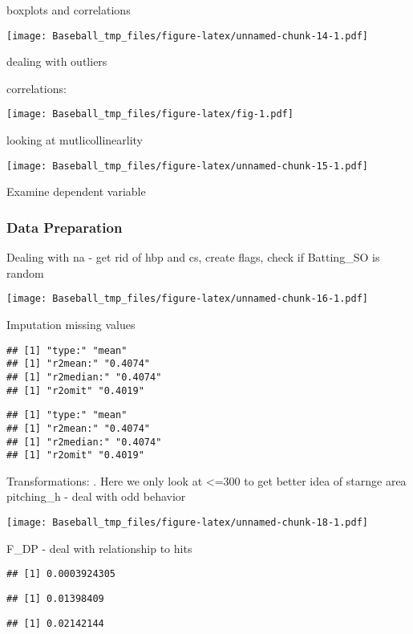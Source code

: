 \documentclass[
]{article}
\begin{document}
boxplots and correlations

\texttt{[image: Baseball\_tmp\_files/figure-latex/unnamed-chunk-14-1.pdf]}

dealing with outliers

correlations:

\texttt{[image: Baseball\_tmp\_files/figure-latex/fig-1.pdf]}

looking at mutlicollinearlity

\texttt{[image: Baseball\_tmp\_files/figure-latex/unnamed-chunk-15-1.pdf]}

Examine dependent variable

\hypertarget{data-preparation}{%
\subsubsection{Data Preparation}\label{data-preparation}}

Dealing with na - get rid of hbp and cs, create flags, check if
Batting\_SO is random

\texttt{[image: Baseball\_tmp\_files/figure-latex/unnamed-chunk-16-1.pdf]}

Imputation missing values

\begin{verbatim}
## [1] "type:" "mean" 
## [1] "r2mean:" "0.4074" 
## [1] "r2median:" "0.4074"   
## [1] "r2omit" "0.4019"
\end{verbatim}

\begin{verbatim}
## [1] "type:" "mean" 
## [1] "r2mean:" "0.4074" 
## [1] "r2median:" "0.4074"   
## [1] "r2omit" "0.4019"
\end{verbatim}

Transformations: . Here we only look at \textless=300 to get better idea
of starnge area pitching\_h - deal with odd behavior

\texttt{[image: Baseball\_tmp\_files/figure-latex/unnamed-chunk-18-1.pdf]}

F\_DP - deal with relationship to hits

\begin{verbatim}
## [1] 0.0003924305
\end{verbatim}

\begin{verbatim}
## [1] 0.01398409
\end{verbatim}

\begin{verbatim}
## [1] 0.02142144
\end{verbatim}
\end{document}
